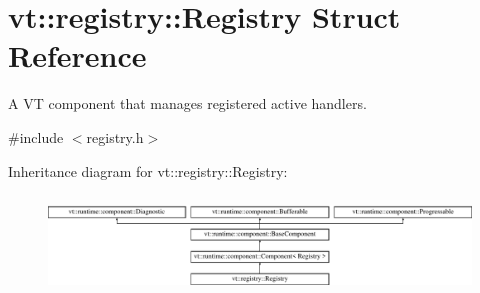 \hypertarget{structvt_1_1registry_1_1_registry}{}\section{vt\+:\+:registry\+:\+:Registry Struct Reference}
\label{structvt_1_1registry_1_1_registry}


A VT component that manages registered active handlers.  




{\ttfamily \#include $<$registry.\+h$>$}

Inheritance diagram for vt\+:\+:registry\+:\+:Registry\+:\begin{figure}[H]
\begin{center}
\leavevmode
\includegraphics[height=2.638398cm]{structvt_1_1registry_1_1_registry}
\end{center}
\end{figure}

